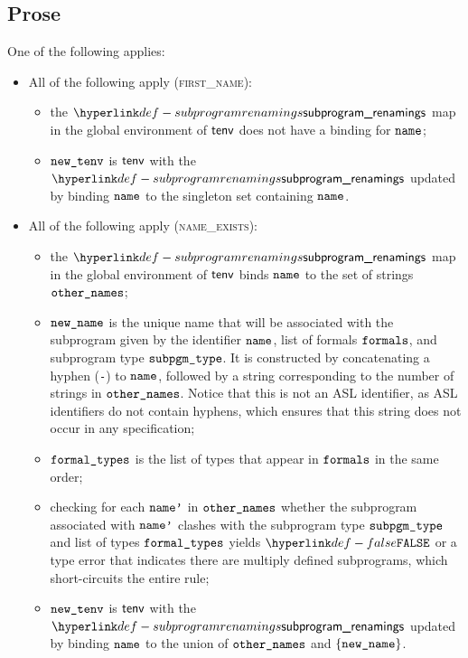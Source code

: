 \documentclass{book}
\begin{document}
\subsection{Prose}
One of the following applies:
\begin{itemize}
  \item All of the following apply (\textsc{first\_name}):
  \begin{itemize}
    \item the $\subprogramrenamings$ map in the global environment of $\textsf{tenv}$ does not have a binding for $\texttt{name}$;
    \item $\texttt{new\_tenv}$ is $\textsf{tenv}$ with the $\subprogramrenamings$ updated by binding $\texttt{name}$ to the singleton set containing
          $\texttt{name}$.
  \end{itemize}

  \item All of the following apply (\textsc{name\_exists}):
  \begin{itemize}
    \item the $\subprogramrenamings$ map in the global environment of $\textsf{tenv}$ binds $\texttt{name}$ to the set of strings $\texttt{other\_names}$;
    \item $\texttt{new\_name}$ is the unique name that will be associated with the subprogram given by the identifier $\texttt{name}$, list of formals $\texttt{formals}$,
          and subprogram type $\texttt{subpgm\_type}$. It is constructed by concatenating a hyphen (\texttt{-}) to $\texttt{name}$, followed
          by a string corresponding to the number of strings in $\texttt{other\_names}$.
          Notice that this is not an ASL identifier, as ASL identifiers do not contain hyphens, which ensures that this string
          does not occur in any specification;
    \item $\texttt{formal\_types}$ is the list of types that appear in $\texttt{formals}$ in the same order;
    \item checking for each $\texttt{name'}$ in $\texttt{other\_names}$ whether the subprogram associated with $\texttt{name'}$ clashes
          with the subprogram type $\texttt{subpgm\_type}$ and list of types $\texttt{formal\_types}$ yields $\False$
          or a type error that indicates there are multiply defined subprograms, which short-circuits the entire rule;
    \item $\texttt{new\_tenv}$ is $\textsf{tenv}$ with the $\subprogramrenamings$ updated by binding $\texttt{name}$ to the union of $\texttt{other\_names}$ and
          $\{\texttt{new\_name}\}$.
  \end{itemize}
\end{itemize}

\end{document}
